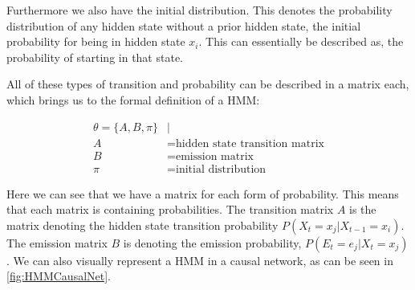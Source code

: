 Furthermore we also have the initial distribution. This denotes the probability distribution of any hidden state without a prior hidden state, the initial probability for being in hidden state $x_i$. This can essentially be described as, the probability of starting in that state.

All of these types of transition and probability can be described in a matrix each, which brings us to the formal definition of a HMM:

\begin{align*}
\theta = \{A,B,\pi\} &|\\
A &= \text{hidden state transition matrix}\\
B &= \text{emission matrix}\\
\pi &= \text{initial distribution}
\end{align*}

Here we can see that we have a matrix for each form of probability. This means that each matrix is containing probabilities. The transition matrix $A$ is the matrix denoting the hidden state transition probability $P(X_t=x_j|X_{t-1}=x_i)$. The emission matrix $B$ is denoting the emission probability, $P(E_t=e_j|X_t=x_j)$. We can also visually represent a HMM in a causal network, as can be seen in \cref{fig:HMMCausalNet}.

